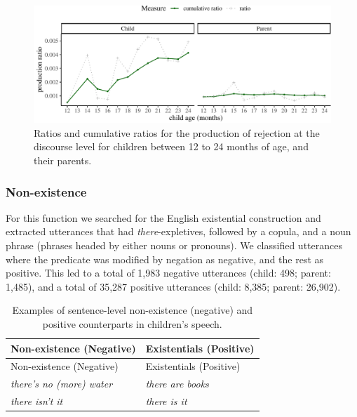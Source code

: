 \documentclass[
  english,
  man,floatsintext]{apa6}
\begin{document}
\begin{figure}[H]

{\centering \includegraphics{neg_construction_article_files/figure-latex/emotiondiscoursebegin-1} 

}

\caption{Ratios and cumulative ratios for the production of rejection at the discourse level for children between 12 to 24 months of age, and their parents.}\label{fig:emotiondiscoursebegin}
\end{figure}

\hypertarget{non-existence}{%
\subsubsection{Non-existence}\label{non-existence}}

For this function we searched for the English existential construction and extracted utterances that had \emph{there}-expletives, followed by a copula, and a noun phrase (phrases headed by either nouns or pronouns). We classified utterances where the predicate was modified by negation as negative, and the rest as positive. This led to a total of 1,983 negative utterances (child: 498; parent: 1,485), and a total of 35,287 positive utterances (child: 8,385; parent: 26,902).

\begin{longtable}[]{@{}ll@{}}
\caption{\label{tab:nonexist} Examples of sentence-level non-existence (negative) and positive counterparts in children's speech.}\tabularnewline
\toprule
Non-existence (Negative) & Existentials (Positive) \\
\midrule
\endfirsthead
\toprule
Non-existence (Negative) & Existentials (Positive) \\
\midrule
\endhead
\emph{there's no (more) water} & \emph{there are books} \\
\emph{there isn't it} & \emph{there is it} \\
\bottomrule
\end{longtable}
\end{document}
